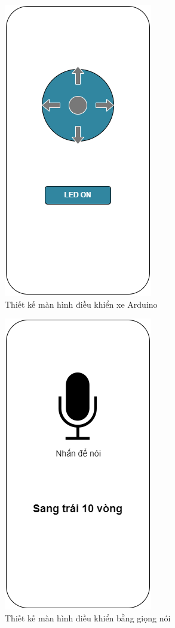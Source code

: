 \documentclass[../DoAn.tex]{subfiles}
\begin{document}
\begin{figure}[H]
    \centering
    \includegraphics[scale = 0.75]{Hinhve/control.png}
    \caption{Thiết kế màn hình điều khiển xe Arduino}
    \label{fig:Fig6}
\end{figure}

\begin{figure}[H]
    \centering
    \includegraphics[scale = 0.75]{Hinhve/voice_control.png}
    \caption{Thiết kế màn hình điều khiển bằng giọng nói}
    \label{fig:Fig7}
\end{figure}
\end{document}
